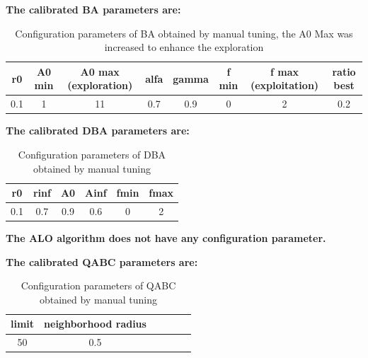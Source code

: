 \documentclass[12pt]{article}
\begin{document}
\textbf{The calibrated BA parameters are:}
\begin{table}[H]    
    \centering
    \footnotesize
    \begin{tabular}{cccccccc}
        
        \hline
        r0&    A0 min&    A0 max (exploration)&    alfa&    gamma&    f min&    f max (exploitation)&    ratio best\\
        
        \hline
        0.1&    1&    11&    0.7&    0.9&    0&    2&    0.2\\
        

        
        \hline 
    \end{tabular} 
    
    \caption{Configuration parameters of BA obtained by manual tuning, the A0 Max was increased to enhance the exploration} 
\end{table}



\textbf{The calibrated DBA parameters are:}
\begin{table}[H]    
    \centering
    \footnotesize
    \begin{tabular}{cccccc}
        
        \hline
        r0&    rinf&    A0&    Ainf&    fmin&    fmax\\
        
        \hline
        0.1&    0.7&    0.9&    0.6&    0&    2\\
        
        
        
        \hline 
    \end{tabular} 
    
    \caption{Configuration parameters of DBA obtained by manual tuning} 
\end{table}


\textbf{The ALO algorithm does not have any configuration parameter.}


\textbf{The calibrated QABC parameters are:}
\begin{table}[H]    
    \centering
    \footnotesize
    \begin{tabular}{cccccc}
        
        \hline
        limit&    neighborhood radius \\
        
        \hline
        50&    0.5\\
        
        
        
        \hline 
    \end{tabular} 
    
    \caption{Configuration parameters of QABC obtained by manual tuning} 
\end{table}
\end{document}
